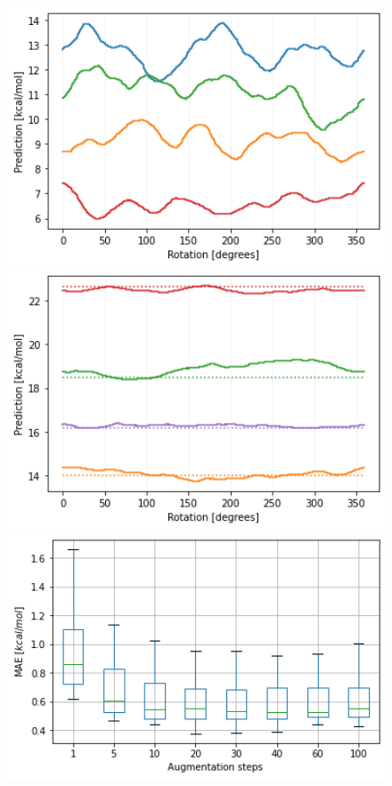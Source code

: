 \begin{figure}[!htb]
    \includegraphics[width=1.0\textwidth]{figures/regression/snap/aug-5.png}
  \endminipage\hfill
  \includegraphics[width=1.0\textwidth]{figures/regression/snap/aug-30.png}
  \endminipage\hfill  
    \includegraphics[width=1.0\textwidth]{figures/regression/snap/augmentation.png}

\end{figure}
